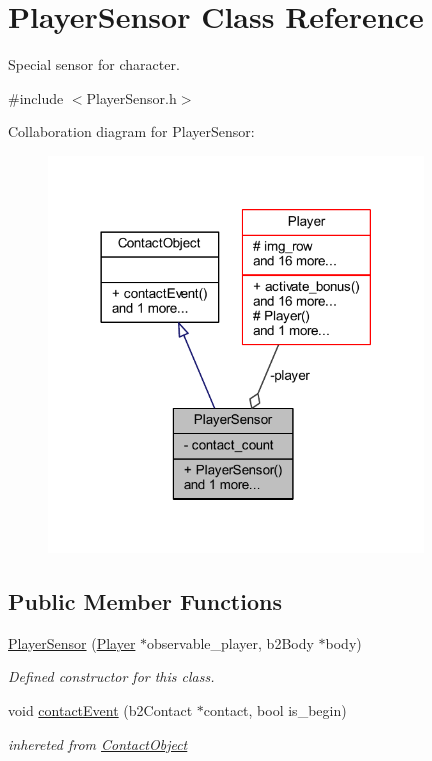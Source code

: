 \hypertarget{class_player_sensor}{}\section{Player\+Sensor Class Reference}
\label{class_player_sensor}


Special sensor for character.  




{\ttfamily \#include $<$Player\+Sensor.\+h$>$}



Collaboration diagram for Player\+Sensor\+:\nopagebreak
\begin{figure}[H]
\begin{center}
\leavevmode
\includegraphics[width=282pt]{class_player_sensor__coll__graph}
\end{center}
\end{figure}
\subsection*{Public Member Functions}
\begin{DoxyCompactItemize}
\item 
\hyperlink{class_player_sensor_a1e74f6ad656f4cdc6449fc55b41dff42}{Player\+Sensor} (\hyperlink{class_player}{Player} $\ast$observable\+\_\+player, b2\+Body $\ast$body)
\begin{DoxyCompactList}\small\item\em Defined constructor for this class. \end{DoxyCompactList}\item 
\mbox{\label{class_player_sensor_a6977b8699ebf0d3d2d2b177665060f21}} 
void \hyperlink{class_player_sensor_a6977b8699ebf0d3d2d2b177665060f21}{contact\+Event} (b2\+Contact $\ast$contact, bool is\+\_\+begin)
\begin{DoxyCompactList}\small\item\em inhereted from \hyperlink{class_contact_object}{Contact\+Object} \end{DoxyCompactList}\end{DoxyCompactItemize}

